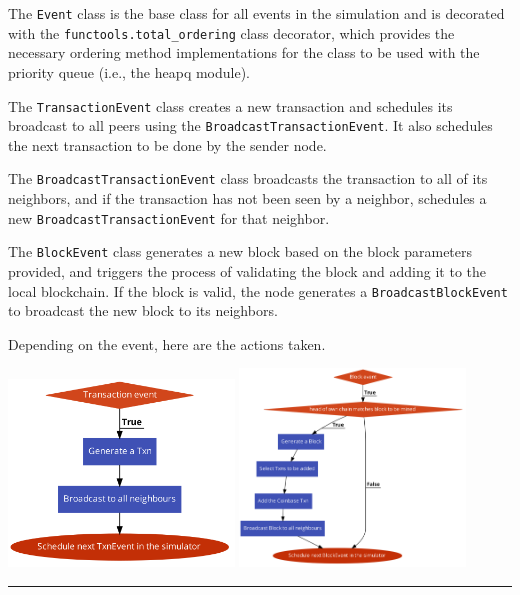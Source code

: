 \documentclass[a4paper,14pt]{article}
\begin{document}
The \verb|Event| class is the base class for all events in the simulation and is decorated with the \verb|functools.total_ordering| class decorator, which provides the necessary ordering method implementations for the class to be used with the priority queue (i.e., the heapq module).

The \verb|TransactionEvent| class creates a new transaction and schedules its broadcast to all peers using the \verb|BroadcastTransactionEvent|. It also schedules the next transaction to be done by the sender node.

The \verb|BroadcastTransactionEvent| class broadcasts the transaction to all of its neighbors, and if the transaction has not been seen by a neighbor, schedules a new \verb|BroadcastTransactionEvent| for that neighbor.

The \verb|BlockEvent| class generates a new block based on the block parameters provided, and triggers the process of validating the block and adding it to the local blockchain. If the block is valid, the node generates a \verb|BroadcastBlockEvent| to broadcast the new block to its neighbors.

Depending on the event, here are the actions taken.

\includegraphics[width=6cm]{Txn.png}
\includegraphics[width=6cm]{Block.png}

\rule[10px]{12cm}{1px}
\end{document}
